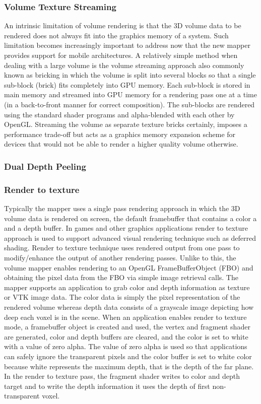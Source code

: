 \subsubsection{Volume Texture Streaming}
An intrinsic limitation of volume rendering is that the 3D volume data to be rendered does not always fit into the graphics memory of a system. Such limitation becomes increasingly important to address now that the new mapper provides support for mobile architectures.
A relatively simple method when dealing with a large volume is the volume streaming approach also commonly known as bricking in which the volume is split into several blocks so that a single sub-block (brick) fits completely into GPU memory.  Each sub-block is stored in main memory and streamed into GPU memory for a rendering pass one at a time (in a back-to-front manner for correct composition). The sub-blocks are rendered using the standard shader programs and alpha-blended with each other by OpenGL. Streaming the volume as separate texture bricks certainly, imposes a performance trade-off but acts as a graphics memory expansion scheme for devices that would not be able to render a higher quality volume otherwise.

\subsubsection{Dual Depth Peeling}
 
 
\subsubsection{Render to texture}
Typically the mapper uses a single pass rendering approach in which the 3D volume data is rendered on screen, the default framebuffer that contains a color a and a depth buffer. In games and other graphics applications render to texture approach is used to support advanced visual rendering technique such as deferred shading. Render to texture technique uses rendered output from one pass to modify/enhance the output of another rendering passes. Unlike to this, the volume mapper enables rendering to an OpenGL FrameBufferObject (FBO) and obtaining the pixel data from the FBO via simple image retrieval calls. The mapper supports an application to grab color and depth information as texture or VTK image data. The color data is simply the pixel representation of the rendered volume whereas depth data consists of a grayscale image depicting how deep each voxel is in the scene. When an application enables render to texture mode, a framebuffer object is created and used, the vertex and fragment shader are generated, color and depth buffers are cleared, and the color is set to white with a value of zero alpha. The value of zero alpha is used so that applications can safely ignore the transparent pixels and the color buffer is set to white color because white represents the maximum depth, that is the depth of the far plane. In the render to texture pass, the fragment shader writes to color and depth target and to write the depth information it uses the depth of first non-transparent voxel.

